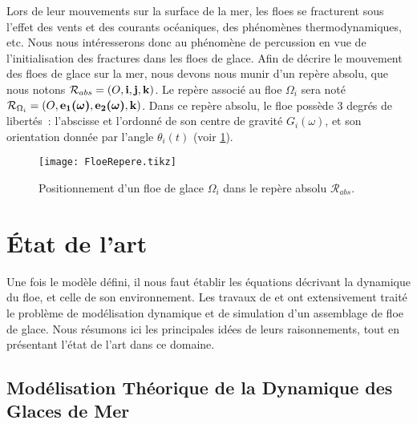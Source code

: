 

Lors de leur mouvements sur la surface de la mer, les floes se fracturent sous l'effet des vents et des courants océaniques, des phénomènes thermodynamiques, etc. Nous nous intéresserons donc au phénomène de percussion en vue de l'initialisation des fractures dans les floes de glace. Afin de décrire le mouvement des floes de glace sur la mer, nous devons nous munir d'un repère absolu, que nous notons $\mathcal{R}_{abs} = (O, \bm{\mathrm{i}}, \bm{\mathrm{j}}, \bm{\mathrm{k}})$. Le repère associé au floe $\Omega_i$ sera noté $\mathcal{R}_{\Omega_i} = (O, \bm {\bm{\mathrm{e}}_1(\omega)}, \bm{\mathrm{\bm{\mathrm{e}}_2(\omega)}}, \bm{\mathrm{k}})$. Dans ce repère absolu, le floe possède 3 degrés de libertés : l'abscisse et l'ordonné de son centre de gravité $G_i(\omega)$, et son orientation donnée par l'angle $\theta_i (t)$ (voir \cref{fig:FloeRepere}). 

\begin{figure}[!h]
    \centering
    \texttt{[image: FloeRepere.tikz]}
    \caption{Positionnement d'un floe de glace $\Omega_i$ dans le repère absolu $\mathcal{R}_{abs}$.}
    \label{fig:FloeRepere}
\end{figure}


\section{État de l'art}

Une fois le modèle défini, il nous faut établir les équations décrivant la dynamique du floe, et celle de son environnement. Les travaux de \cite{rabatel2015thesis} et \cite{balasoiu2020thesis} ont extensivement traité le problème de modélisation dynamique et de simulation d'un assemblage de floe de glace. Nous résumons ici les principales idées de leurs raisonnements, tout en présentant l'état de l'art dans ce domaine.

\subsection{Modélisation Théorique de la Dynamique des Glaces de Mer}

